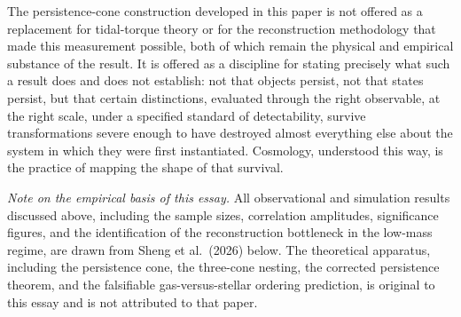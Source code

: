 \documentclass[11pt]{article}
\begin{document}
The persistence-cone construction developed in this paper is not offered as a replacement for tidal-torque theory or for the reconstruction methodology that made this measurement possible, both of which remain the physical and empirical substance of the result. It is offered as a discipline for stating precisely what such a result does and does not establish: not that objects persist, not that states persist, but that certain distinctions, evaluated through the right observable, at the right scale, under a specified standard of detectability, survive transformations severe enough to have destroyed almost everything else about the system in which they were first instantiated. Cosmology, understood this way, is the practice of mapping the shape of that survival.

\bigskip
\noindent\textit{Note on the empirical basis of this essay.} All observational and simulation results discussed above, including the sample sizes, correlation amplitudes, significance figures, and the identification of the reconstruction bottleneck in the low-mass regime, are drawn from Sheng et al.\ (2026) below. The theoretical apparatus, including the persistence cone, the three-cone nesting, the corrected persistence theorem, and the falsifiable gas-versus-stellar ordering prediction, is original to this essay and is not attributed to that paper.
\end{document}
